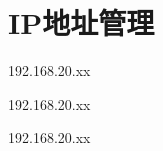 \chapter{IP地址管理}

\begin{compactitem}
\item 192.168.20.xx
\item 192.168.20.xx
\item 192.168.20.xx
\end{compactitem}
